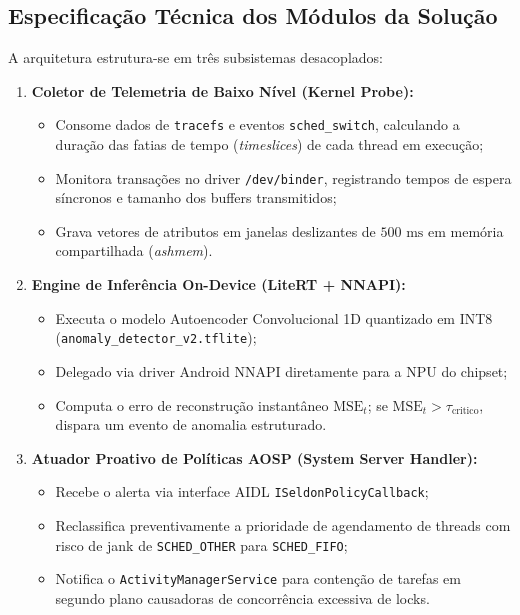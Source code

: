 \subsection{Especificação Técnica dos Módulos da Solução}
A arquitetura estrutura-se em três subsistemas desacoplados:
\begin{enumerate}
    \item \textbf{Coletor de Telemetria de Baixo Nível (Kernel Probe):}
    \begin{itemize}
        \item Consome dados de \texttt{tracefs} e eventos \texttt{sched\_switch}, calculando a duração das fatias de tempo (\textit{timeslices}) de cada thread em execução;
        \item Monitora transações no driver \texttt{/dev/binder}, registrando tempos de espera síncronos e tamanho dos buffers transmitidos;
        \item Grava vetores de atributos em janelas deslizantes de $500\text{ ms}$ em memória compartilhada (\textit{ashmem}).
    \end{itemize}
    \item \textbf{Engine de Inferência On-Device (LiteRT + NNAPI):}
    \begin{itemize}
        \item Executa o modelo Autoencoder Convolucional 1D quantizado em INT8 (\texttt{anomaly\_detector\_v2.tflite});
        \item Delegado via driver Android NNAPI diretamente para a NPU do chipset;
        \item Computa o erro de reconstrução instantâneo $\text{MSE}_t$; se $\text{MSE}_t > \tau_{\text{critico}}$, dispara um evento de anomalia estruturado.
    \end{itemize}
    \item \textbf{Atuador Proativo de Políticas AOSP (System Server Handler):}
    \begin{itemize}
        \item Recebe o alerta via interface AIDL \texttt{ISeldonPolicyCallback};
        \item Reclassifica preventivamente a prioridade de agendamento de threads com risco de jank de \texttt{SCHED\_OTHER} para \texttt{SCHED\_FIFO};
        \item Notifica o \texttt{ActivityManagerService} para contenção de tarefas em segundo plano causadoras de concorrência excessiva de locks.
    \end{itemize}
\end{enumerate}
